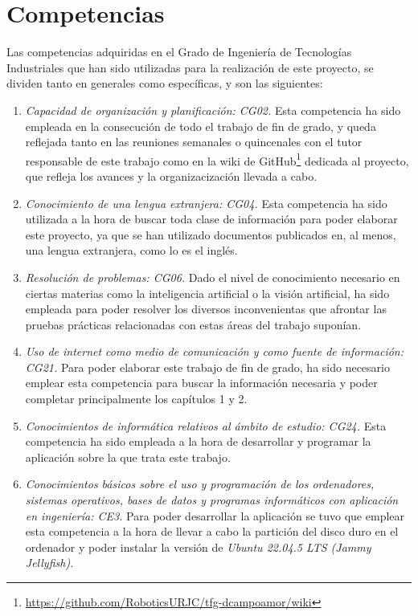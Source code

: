 \section{Competencias}
\label{sec:competencias}

Las competencias adquiridas en el Grado de Ingeniería de Tecnologías Industriales que han sido utilizadas para la realización de este proyecto, se dividen tanto en generales como específicas, y son las siguientes:

\begin{enumerate} 
  \item \textit{Capacidad de organización y planificación: CG02.} Esta competencia ha sido empleada en la consecución de todo el trabajo de fin de grado, y queda reflejada tanto en las reuniones semanales o quincenales con el tutor responsable de este trabajo como en la wiki de GitHub\footnote{\url{https://github.com/RoboticsURJC/tfg-dcampoamor/wiki}} dedicada al proyecto, que refleja los avances y la organizacización llevada a cabo.  
  \item \textit{Conocimiento de una lengua extranjera: CG04.} Esta competencia ha sido utilizada a la hora de buscar toda clase de información para poder elaborar este proyecto, ya que se han utilizado documentos publicados en, al menos, una lengua extranjera, como lo es el inglés.
  \item \textit{Resolución de problemas: CG06.} Dado el nivel de conocimiento necesario en ciertas materias como la inteligencia artificial o la visión artificial, ha sido empleada para poder resolver los diversos inconvenientas que afrontar las pruebas prácticas relacionadas con estas áreas del trabajo suponían.
  \item \textit{Uso de internet como medio de comunicación y como fuente de información: CG21.} Para poder elaborar este trabajo de fin de grado, ha sido necesario emplear esta competencia para buscar la información necesaria y poder completar principalmente los capítulos 1 y 2.
  \item \textit{Conocimientos de informática relativos al ámbito de estudio: CG24.} Esta competencia ha sido empleada a la hora de desarrollar y programar la aplicación sobre la que trata este trabajo.
  \item \textit{Conocimientos básicos sobre el uso y programación de los ordenadores, sistemas operativos, bases de datos y programas informáticos con aplicación en ingeniería: CE3.} Para poder desarrollar la aplicación se tuvo que emplear esta competencia a la hora de llevar a cabo la partición del disco duro en el ordenador y poder instalar la versión de \textit{Ubuntu 22.04.5 LTS (Jammy Jellyfish)}.  

\end{enumerate}
